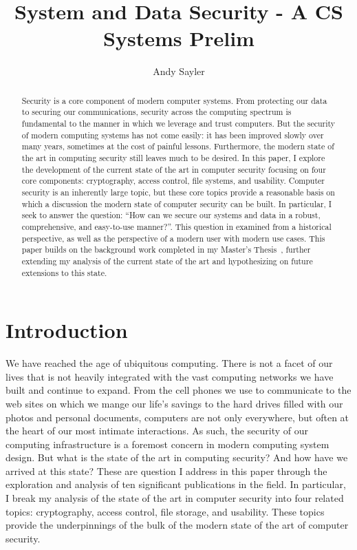 \documentclass{sig-alternate}
\begin{document}
\title{System and Data Security - A CS Systems Prelim}

\author{
  \alignauthor
  Andy Sayler\\
}

\maketitle

\begin{abstract}
Security is a core component of modern computer systems. From
protecting our data to securing our communications, security across
the computing spectrum is fundamental to the manner in which we
leverage and trust computers. But the security of modern computing
systems has not come easily: it has been improved slowly over many
years, sometimes at the cost of painful lessons. Furthermore, the
modern state of the art in computing security still leaves much to be
desired. In this paper, I explore the development of the current state
of the art in computer security focusing on four core components:
cryptography, access control, file systems, and usability. Computer
security is an inherently large topic, but these core topics provide a
reasonable basis on which a discussion the modern state of computer
security can be built. In particular, I seek to answer the question:
``How can we secure our systems and data in a robust, comprehensive,
and easy-to-use manner?''. This question in examined from a historical
perspective, as well as the perspective of a modern user with modern
use cases. This paper builds on the background work completed in my
Master's Thesis~\cite{custos-masters}, further extending my analysis
of the current state of the art and hypothesizing on future extensions
to this state.
\end{abstract}

\section{Introduction}
\label{sec:intro}

We have reached the age of ubiquitous computing. There is not a facet
of our lives that is not heavily integrated with the vast computing
networks we have built and continue to expand. From the cell phones we
use to communicate to the web sites on which we mange our life's
savings to the hard drives filled with our photos and personal
documents, computers are not only everywhere, but often at the heart
of our most intimate interactions. As such, the security of our
computing infrastructure is a foremost concern in modern computing
system design. But what is the state of the art in computing security?
And how have we arrived at this state? These are question I address in
this paper through the exploration and analysis of ten significant
publications in the field. In particular, I break my analysis of the
state of the art in computer security into four related topics:
cryptography, access control, file storage, and usability. These
topics provide the underpinnings of the bulk of the modern state of
the art of computer security.
\end{document}
